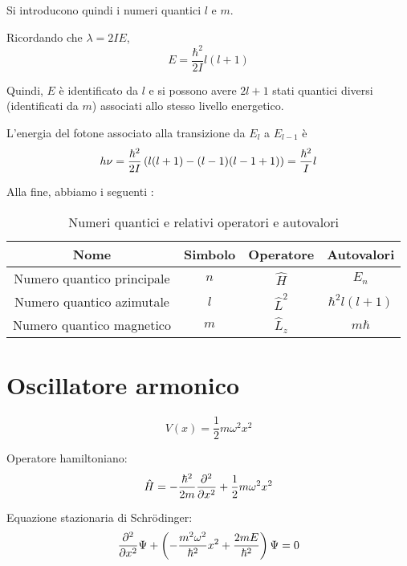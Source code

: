 Si introducono quindi i numeri quantici $l$ e $m$.

Ricordando che $\lambda = 2 I E$,
\begin{equation}
    E = \frac{\hbar^2}{2 I} l (l + 1)
\end{equation}

Quindi, $E$ è identificato da $l$ e si possono avere $2l + 1$ stati quantici diversi (identificati da $m$) associati allo stesso livello energetico.

L'energia del fotone associato alla transizione da $E_l$ a $E_{l-1}$ è
\begin{equation}
    h \nu = \frac{\hbar^2}{2 I} \left( l (l + 1) - (l - 1) (l - 1 + 1) \right) = \frac{\hbar^2}{I} l
\end{equation}

Alla fine, abbiamo i seguenti :
\begin{table}[!h]
    \centering
    \begin{tabular}{|c|c|c|c|}
        \hline
        Nome & Simbolo & Operatore & Autovalori \\
        \hline
        Numero quantico principale & $n$ & $\hat{H}$ & $E_n$ \\
        Numero quantico azimutale & $l$ & $\hat{L}^2$ & $\hbar^2 l (l + 1)$ \\
        Numero quantico magnetico & $m$ & $\hat{L}_z$ & $m \hbar$ \\
        \hline
    \end{tabular}
    \caption{Numeri quantici e relativi operatori e autovalori}
    \label{tab:numeri_quantici}
\end{table}

\section{Oscillatore armonico}

\begin{equation}
    V(x) = \frac{1}{2} m \omega^2 x^2
\end{equation}

Operatore hamiltoniano:
\begin{equation}
    \hat{H} = -\frac{\hbar^2}{2 m} \parder[][2]{x} + \frac{1}{2} m \omega^2 x^2
\end{equation}

Equazione stazionaria di Schrödinger:
\begin{equation}
    \parder[][2]{x} \Psi + \pts{- \frac{m^2 \omega^2}{\hbar^2} x^2 + \frac{2 m E}{\hbar^2}} \Psi = 0
\end{equation}

